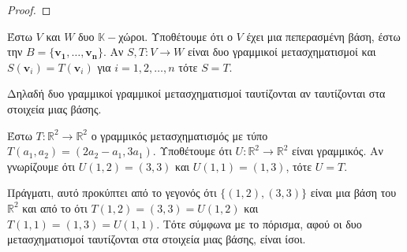 \begin{proof}

\end{proof}

\begin{cor}
  Έστω $V$ και $W$ δυο $ \mathbb{K}- $χώροι. Υποθέτουμε ότι ο $V$ έχει μια πεπερασμένη 
  βάση, έστω την $ B = \{ \mathbf{v_{1}}, \ldots, \mathbf{v_{n}} \} $. Αν 
  $ S,T \colon V \to W$ είναι δυο γραμμικοί μετασχηματισμοί και 
  $ S(\mathbf{v}_{i}) = T(\mathbf{v}_{i}) $ για $ i=1,2,\ldots,n $ τότε $ S=T $.
\end{cor}

\begin{rem}
  Δηλαδή δυο γραμμικοί γραμμικοί μετασχηματισμοί ταυτίζονται αν ταυτίζονται στα στοιχεία
  μιας βάσης.
\end{rem}

\begin{example}
  Έστω $ T \colon \mathbb{R}^{2} \to \mathbb{R}^{2} $ ο γραμμικός μετασχηματισμός με 
  τύπο $ T(a_{1}, a_{2}) = (2 a_{2}- a_{1}, 3 a_{1}) $. 
  Υποθέτουμε ότι $ U \colon \mathbb{R}^{2} \to \mathbb{R}^{2} $ είναι γραμμικός. Αν 
  γνωρίζουμε ότι $ U(1,2) = (3,3) $ και $ U(1,1) = (1,3) $, τότε $ U=T $. 

  Πράγματι, αυτό προκύπτει από το γεγονός ότι $ \{ (1,2), (3,3) \}  $ είναι μια βάση 
  του $ \mathbb{R}^{2} $ και από το ότι $ T(1,2)=(3,3) = U(1,2) $ και 
  $ T(1,1) = (1,3) = U(1,1) $. Τότε σύμφωνα με το πόρισμα, αφού οι δυο μετασχηματισμοί 
  ταυτίζονται στα στοιχεία μιας βάσης, είναι ίσοι.
\end{example}


 
